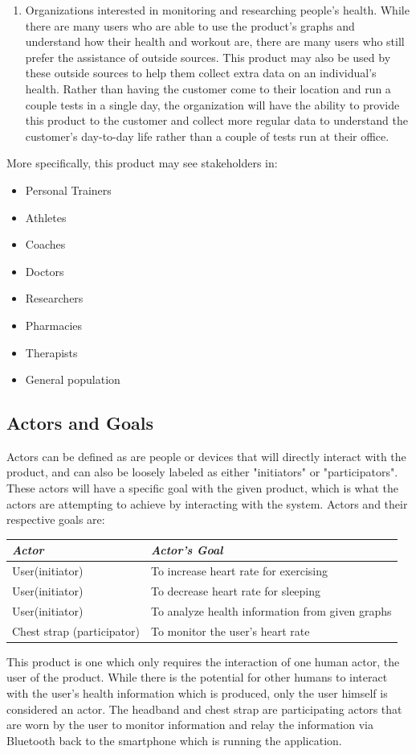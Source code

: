 \documentclass[letterpaper,english, 12pt]{scrreprt}
\begin{document}
\begin{enumerate}
	\item Organizations interested in monitoring and researching people's health. While there are many users who are able to use the product's graphs and understand how their health and workout are, there are many users who still prefer the assistance of outside sources. This product may also be used by these outside sources to help them collect extra data on an individual's health. Rather than having the customer come to their location and run a couple tests in a single day, the organization will have the ability to provide this product to the customer and collect more regular data to understand the customer's day-to-day life rather than a couple of tests run at their office.
\end{enumerate}

More specifically, this product may see stakeholders in:
\begin{itemize}
	\item Personal Trainers
	\item Athletes
	\item Coaches
	\item Doctors
	\item Researchers
	\item Pharmacies
	\item Therapists
	\item General population
\end{itemize}

\subsection{Actors and Goals}
Actors can be defined as are people or devices that will directly interact with the product, and can also be loosely labeled as either "initiators" or "participators". These actors will have a specific goal with the given product, which is what the actors are attempting to achieve by interacting with the system. Actors and their respective goals are:
\begin{center}
	\begin{tabular}{|l|l|}
		\hline
		\emph{Actor} & \emph{Actor's Goal} \\\hline
		User(initiator)& To increase heart rate for exercising\\\hline
		User(initiator)& To decrease heart rate for sleeping\\\hline
		User(initiator)& To analyze health information from given graphs\\\hline
		Chest strap (participator)& To monitor the user's heart rate\\\hline
	\end{tabular}
\end{center}
This product is one which only requires the interaction of one human actor, the user of the product. While there is the potential for other humans to interact with the user's health information which is produced, only the user himself is considered an actor. The headband and chest strap are participating actors that are worn by the user to monitor information and relay the information via Bluetooth back to the smartphone which is running the application.
\end{document}
